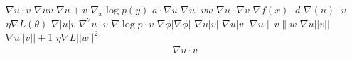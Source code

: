 \documentclass{article}
\begin{document}
$\nabla u\cdot v$ $\nabla u v$ $\nabla u+v$ $\nabla_{x}\log p(y)$ $a\cdot\nabla u$
$\nabla u\cdot vw$ $\nabla u\cdot\nabla v$ $\nabla f(x)\cdot d$ $\nabla(u)\cdot v$ $\eta\nabla L(\theta)$
$\nabla|u|v$ $\nabla^{2}u\cdot v$ $\nabla\log p\cdot v$
$\nabla\phi\left|\nabla\phi\right|$ $\nabla u\left|v\right|$ $\nabla u\lvert v\rvert$ $\nabla u\|v\|w$
$\nabla u||v||$ $\nabla u||v||+1$ $\eta\nabla L||w||^{2}$
\[\begin{split}\nabla u\cdot v\end{split}\]
\end{document}
